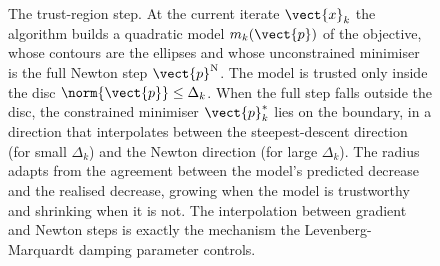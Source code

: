 \begin{figure}[ht]
\begin{tikzpicture}[x=1cm, y=1cm, font=\small]
\end{tikzpicture}
\caption[The trust-region subproblem]{The trust-region step. At the
current iterate $\vect{x}_{k}$ the algorithm builds a quadratic model
$m_{k}(\vect{p})$ of the objective, whose contours are the ellipses
and whose unconstrained minimiser is the full Newton step
$\vect{p}^{\mathrm{N}}$. The model is trusted only inside the disc
$\norm{\vect{p}} \le \Delta_{k}$. When the full step falls outside the
disc, the constrained minimiser $\vect{p}_{k}^{*}$ lies on the
boundary, in a direction that interpolates between the steepest-descent
direction (for small $\Delta_{k}$) and the Newton direction (for large
$\Delta_{k}$). The radius adapts from the agreement between the model's
predicted decrease and the realised decrease, growing when the model is
trustworthy and shrinking when it is not. The interpolation between
gradient and Newton steps is exactly the mechanism the
Levenberg-Marquardt damping parameter controls.}
\label{fig:vol02:ch15:trust-region}
\end{figure}
